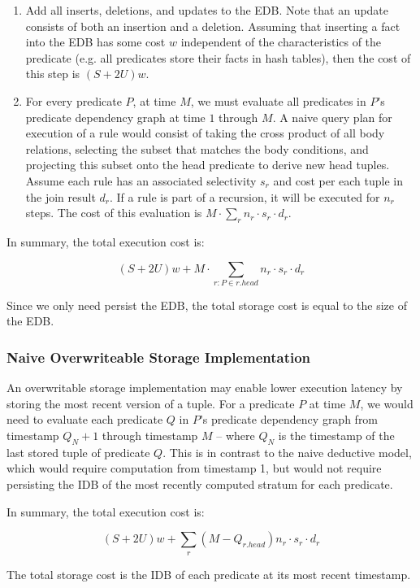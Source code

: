 \begin{enumerate}

\item Add all inserts, deletions, and updates to the EDB.  
Note that an update consists of both an insertion and a deletion.  Assuming
that inserting a fact into the EDB has some cost $w$ independent of the
characteristics of the predicate (e.g. all predicates store their facts in hash
tables), then the cost of this step is $(S+2U)w$.

\item For every predicate $P$, at time $M$, we must evaluate all predicates in
$P$'s predicate dependency graph at time $1$ through $M$.  
A naive query plan for execution of a rule would consist of taking the cross
product of all body relations, selecting the subset that matches the body
conditions, and projecting this subset onto the head predicate to derive new
head tuples.  Assume each rule has an associated
selectivity $s_r$ and cost per each tuple in the join result $d_r$.  If a rule
is part of a recursion, it will be executed for $n_r$ steps.  The cost
of this evaluation is $M \cdot \sum_{r} n_r \cdot s_r \cdot d_r$.

\end{enumerate}

In summary, the total execution cost is:

\[ (S+2U)w + M \cdot \sum_{r : P \in r.head} n_r \cdot s_r \cdot d_r  \]

Since we only need persist the EDB, the total storage cost is equal to the size
of the EDB.


\subsubsection{Naive Overwriteable Storage Implementation}

An overwritable storage implementation may enable lower execution latency by
storing the most recent version of a tuple.  For a predicate $P$ at time $M$,
we would need to evaluate each predicate $Q$ in $P$'s predicate dependency
graph from timestamp $Q_N+1$ through timestamp $M$ -- where $Q_N$ is the
timestamp of the last stored tuple of predicate $Q$. This is in contrast to the
naive deductive model, which would require computation from timestamp 1, but
would not require persisting the IDB of the most recently computed stratum for
each predicate.

In summary, the total execution cost is:

\[ (S+2U)w + \sum_{r} (M - Q_{r.head}) n_r \cdot s_r \cdot d_r  \]

The total storage cost is the IDB of each predicate at its most recent
timestamp.

